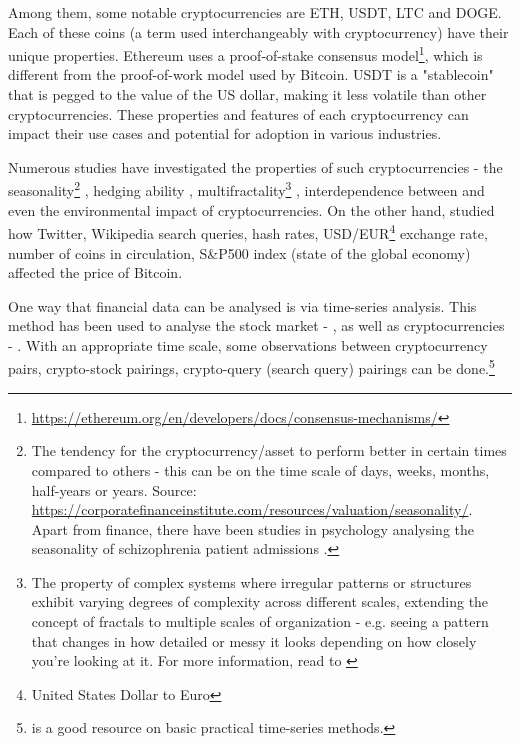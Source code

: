\documentclass[a4paper, 10pt, conference]{ieeeconf}      %
\begin{document}
Among them, some notable cryptocurrencies are ETH, USDT, LTC and DOGE. Each of these coins (a term used interchangeably with cryptocurrency) have their unique properties. Ethereum uses a proof-of-stake consensus model\footnote{\url{https://ethereum.org/en/developers/docs/consensus-mechanisms/}}, which is different from the proof-of-work model used by Bitcoin. USDT is a "stablecoin" that is pegged to the value of the US dollar, making it less volatile than other cryptocurrencies. These properties and features of each cryptocurrency can impact their use cases and potential for adoption in various industries.

Numerous studies have investigated the properties of such cryptocurrencies - the seasonality\footnote{The tendency for the cryptocurrency/asset to perform better in certain times compared to others - this can be on the time scale of days, weeks, months, half-years or years. Source: \url{https://corporatefinanceinstitute.com/resources/valuation/seasonality/}. Apart from finance, there have been studies in psychology analysing the seasonality of schizophrenia patient admissions \cite{Yao2023}.} \cite{Kaiser2019}, hedging ability \cite{Chan2019}, multifractality\footnote{The property of complex systems where irregular patterns or structures exhibit varying degrees of complexity across different scales, extending the concept of fractals to multiple scales of organization - e.g. seeing a pattern that changes in how detailed or messy it looks depending on how closely you're looking at it. For more information, read to \cite{Harte2001}} \cite{Takaishi2018}, interdependence between \cite{Qureshi2020} and even the environmental impact \cite{Wendl2023, Mohsin2021, Corbet2020} of cryptocurrencies. On the other hand, \cite{Georgoula2015} studied how Twitter, Wikipedia search queries, hash rates, USD/EUR\footnote{United States Dollar to Euro} exchange rate, number of coins in circulation, S\&P500 index (state of the global economy) affected the price of Bitcoin.

One way that financial data can be analysed is via time-series analysis. This method has been used to analyse the stock market - \cite{cao1992nonlinear, naik2013does, parray2020time}, as well as cryptocurrencies - \cite{Georgoula2015, Catania2017, Hagemann2018, Maleki2023, Vaz2020, Toyoda2018}. With an appropriate time scale, some observations between cryptocurrency pairs, crypto-stock pairings, crypto-query (search query) pairings can be done.\footnote{\cite{Pal2017} is a good resource on basic practical time-series methods.}
\end{document}
